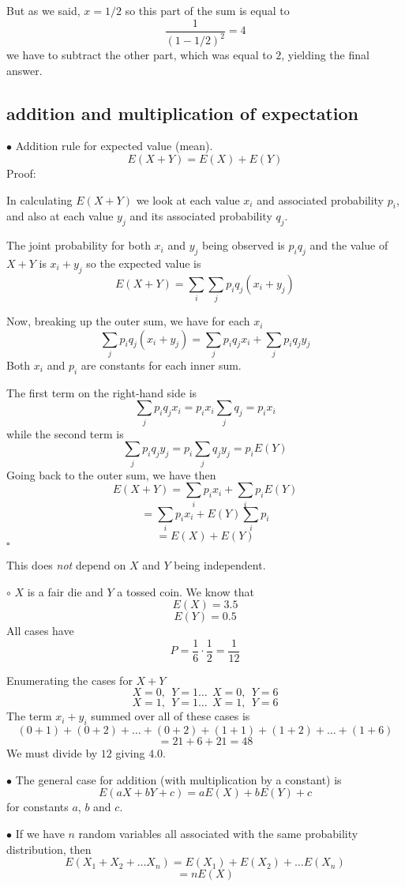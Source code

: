 \documentclass[11pt, oneside]{article}
\begin{document}
But as we said, $ x= 1/2$ so this part of the sum is equal to
\[ \frac{1}{(1-1/2)^2} = 4 \]
we have to subtract the other part, which was equal to $2$, yielding the final answer.

\subsection*{addition and multiplication of expectation}
$\bullet$ Addition rule for expected value (mean).
\[ E(X + Y) = E(X) + E(Y) \]
Proof:

In calculating $E(X + Y)$ we look at each value $x_i$ and associated probability $p_i$, and also at each value $y_j$ and its associated probability $q_j$.

The joint probability for both $x_i$ and $y_j$ being observed is $p_i q_j$ and the value of $X + Y$ is $x_i + y_j$ so the expected value is
\[ E(X + Y) = \sum_i \sum_j p_i q_j (x_i + y_j) \]

Now, breaking up the outer sum, we have for each $x_i$
\[ \sum_j p_i q_j (x_i + y_j) =  \sum_j p_i q_j x_i  +  \sum_j p_i q_j y_j \]
Both $x_i$ and $p_i$ are constants for each inner sum.

The first term on the right-hand side is
\[  \sum_j p_i q_j x_i = p_i  x_i \sum_j q_j = p_i x_i \]
while the second term is
\[ \sum_j p_i q_j y_j = p_i \sum_j q_j y_j = p_i E(Y) \]
Going back to the outer sum, we have then
\[ E(X + Y) = \sum_i p_i x_i + \sum_i  p_i E(Y) \]
\[ = \sum_i p_i x_i + E(Y) \sum_i  p_i \]
\[ = E(X) + E(Y) \]
$\square$

This does \emph{not} depend on $X$ and $Y$ being independent.

$\circ$ $X$ is a fair die and $Y$ a tossed coin.  We know that 
\[ E(X) = 3.5 \] 
\[ E(Y) = 0.5 \]
All cases have
\[ P = \frac{1}{6} \cdot \frac{1}{2} = \frac{1}{12} \]

Enumerating the cases for $X + Y$
\[ X = 0, \ \ Y = 1 \dots \ \  X = 0, \ \ Y = 6 \]
\[ X = 1, \ \ Y = 1 \dots \ \  X = 1, \ \ Y = 6 \]
The term $x_i + y_i$ summed over all of these cases is 
\[ (0 + 1) + (0 + 2) + \dots + (0 + 2) + (1 + 1) + (1 + 2) + \dots + (1 + 6) \]
\[ = 21 + 6 + 21 = 48 \]
We must divide by $12$ giving $4.0$.

$\bullet$ The general case for addition (with multiplication by a constant) is
\[ E(aX + bY + c) = aE(X) + bE(Y) + c \]
for constants $a$, $b$ and $c$.

$\bullet$ If we have $n$ random variables all associated with the same probability distribution, then
\[ E(X_1 + X_2 + \dots X_n) = E(X_1) + E(X_2) + \dots E(X_n) \]
\[ = n E(X) \]
\end{document}

